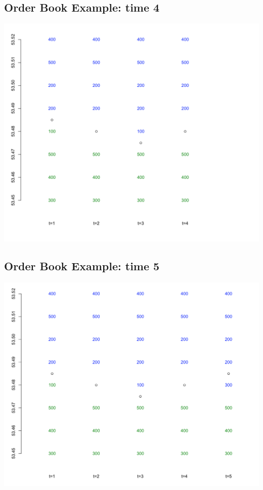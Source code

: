 \documentclass[letterpaper,10pt,english]{sphinxmanual}
\begin{document}
\subsection{Order Book Example: time 4}
\label{trading:order-book-example-time-4}
\includegraphics[width=6in]{orderBook4.png}


\subsection{Order Book Example: time 5}
\label{trading:order-book-example-time-5}
\includegraphics[width=6in]{orderBook5.png}
\end{document}

